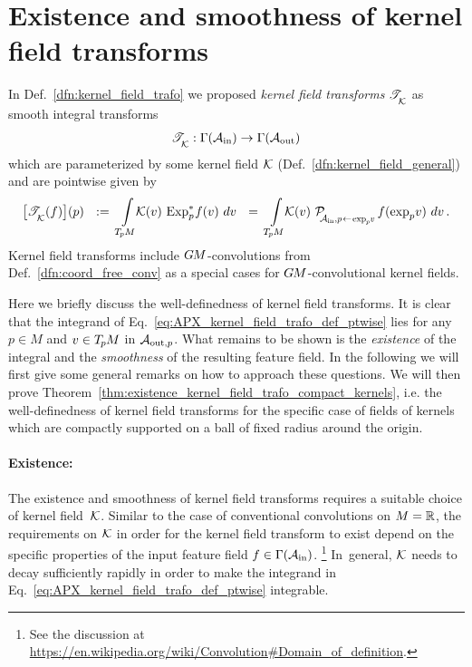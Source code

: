

\filbreak

\section{Existence and smoothness of kernel field transforms}
\label{apx:smoothness_kernel_field_trafo}


In Def.~\ref{dfn:kernel_field_trafo} we proposed \emph{kernel field transforms} $\mathscr{T}_{\overset{}{\mkern-0mu \mathcal{K}}}$ as smooth integral transforms
\begin{align}
    \mathscr{T}_{\overset{}{\mkern-0mu \mathcal{K}}}: \Gamma(\mathcal{A}_\textup{in})\to \Gamma(\mathcal{A}_\textup{out})
\end{align}
which are parameterized by some kernel field $\mathcal{K}$ (Def.~\ref{dfn:kernel_field_general}) and are pointwise given by
\begin{align}\label{eq:APX_kernel_field_trafo_def_ptwise}
    \big[ \TK (f)\big] (p)
    \ \ :=\ 
    \int\limits_{\TpM}\!\!
    \K(v) \,
    \Expspf(v)
    \ dv
    \ \ =\ 
    \int\limits_{\TpM}\!\!
    \K(v) \ 
    \PAinexppv \,
    f(\exp_p\!v)
    \ dv \,.
\end{align}
Kernel field transforms include $G\mkern-1.4muM$-convolutions from Def.~\ref{dfn:coord_free_conv} as a special cases for $G\mkern-1.4muM$-convolutional kernel fields.

Here we briefly discuss the well-definedness of kernel field transforms.
It is clear that the integrand of Eq.~\eqref{eq:APX_kernel_field_trafo_def_ptwise} lies for any $p\in M$ and $v \in T_{\mkern-1.5mu p}\mkern-.5muM$ in $\mathcal{A}_{\textup{out},p}$.
What remains to be shown is the \emph{existence} of the integral and the \emph{smoothness} of the resulting feature field.
In the following we will first give some general remarks on how to approach these questions.
We will then prove Theorem~\ref{thm:existence_kernel_field_trafo_compact_kernels}, i.e. the well-definedness of kernel field transforms for the specific case of fields of kernels which are compactly supported on a ball of fixed radius around the origin.







\paragraph{Existence:}
The existence and smoothness of kernel field transforms requires a suitable choice of kernel field~$\mathcal{K}$.
Similar to the case of conventional convolutions on $M=\mathbb{R}$, the requirements on $\mathcal{K}$ in order for the kernel field transform to exist depend on the specific properties of the input feature field $f\in\Gamma(\mathcal{A}_\textup{in})$.%
\footnote{
    See the discussion at \url{https://en.wikipedia.org/wiki/Convolution\#Domain_of_definition}.
}
In~general, $\mathcal{K}$ needs to decay sufficiently rapidly in order to make the integrand in Eq.~\eqref{eq:APX_kernel_field_trafo_def_ptwise} integrable.


